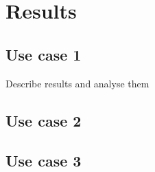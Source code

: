 

    \chapter{Results}

    \section{Use case 1}

    Describe results and analyse them

    \section{Use case 2}

    \section{Use case 3}

